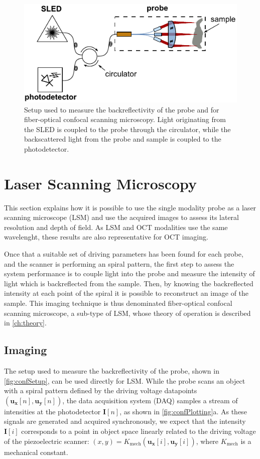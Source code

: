 \begin{figure}[h!]\centering \includegraphics[width=12cm]{figures/50_Measurements/conf/setup/confSetup.pdf}
      \caption{Setup used to measure the backreflectivity of the probe and for fiber-optical confocal scanning microscopy. Light originating from the SLED is coupled to the probe through the circulator, while the backscattered light from the probe and sample is coupled to the photodetector.}
      \label{fig:confSetup}
\end{figure}

\section{Laser Scanning Microscopy}
This section explains how it is possible to use the single modality probe as a laser scanning microscope (LSM) and use the acquired images to assess its lateral resolution and depth of field. As LSM and OCT modalities use the same wavelenght, these results are also representative for OCT imaging.

Once that a suitable set of driving parameters has been found for each probe, and the scanner is performing an spiral pattern, the first step to assess the system performance is to couple light into the probe and measure the intensity of light which is backreflected from the sample. Then, by knowing the backreflected intensity at each point of the spiral it is possible to reconstruct an image of the sample. This imaging technique is thus denominated fiber-optical confocal scanning microscope, a sub-type of LSM, whose theory of operation is described in \autoref{ch:theory}.


\subsection{Imaging}
The setup used to measure the backreflectivity of the probe, shown in \autoref{fig:confSetup}, can be used directly for LSM. While the probe scans an object with a spiral pattern defined by the driving voltage datapoints $(\mathbf{u_x}[n], \mathbf{u_y}[n])$, the data acquisition system (DAQ) samples a stream of intensities at the photodetector $\mathbf{I}[n]$, as shown in \autoref{fig:confPlotting}a. As these signals are generated and acquired synchronously, we expect that the intensity $\mathbf{I}[i]$ corresponds to a point in object space linearly related to the driving voltage of the piezoelectric scanner: $(x, y) = K_\mathrm{mech}(\mathbf{u_x}[i], \mathbf{u_y}[i])$, where $K_\mathrm{mech}$ is a mechanical constant.

